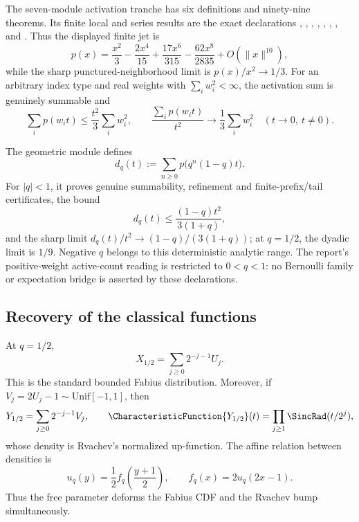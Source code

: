 \documentclass[11pt]{article}
\numberwithin{equation}{section}
\theoremstyle{definition}
\theoremstyle{remark}
\begin{document}
The seven-module activation tranche has six definitions and ninety-nine theorems.  Its
finite local and series results are the exact declarations
,
,
,
,
,
,
, and
.  Thus the displayed finite jet is
\[
 p(x)=\frac{x^2}{3}-\frac{2x^4}{15}+\frac{17x^6}{315}
      -\frac{62x^8}{2835}+O(\lVert x\rVert^{10}),
\]
while the sharp punctured-neighborhood limit is \(p(x)/x^2\to1/3\).  For an arbitrary
index type and real weights with \(\sum_iw_i^2<\infty\), the activation sum is genuinely
summable and
\[
 \sum_i p(w_i t)\le \frac{t^2}{3}\sum_iw_i^2,
 \qquad
 \frac{\sum_i p(w_i t)}{t^2}\longrightarrow
 \frac13\sum_iw_i^2\quad(t\to0,\ t\ne0).
\]

The geometric module defines
\[
 d_q(t):=\sum_{n\ge0}p\bigl(q^n(1-q)t\bigr).
\]
For \(\lvert q\rvert<1\), it proves genuine summability, refinement and finite-prefix/tail
certificates, the bound
\[
 d_q(t)\le\frac{(1-q)t^2}{3(1+q)},
\]
and the sharp limit \(d_q(t)/t^2\to(1-q)/(3(1+q))\); at \(q=1/2\), the dyadic limit is
\(1/9\).  Negative \(q\) belongs to this deterministic analytic range.  The report's
positive-weight active-count reading is restricted to \(0<q<1\): no Bernoulli family or
expectation bridge is asserted by these declarations.

\subsection{Recovery of the classical functions}

At $q=1/2$,
\[
 X_{1/2}=\sum_{j\ge0}2^{-j-1}U_j.
\]
This is the standard bounded Fabius distribution.  Moreover, if
$V_j=2U_j-1\sim\mathrm{Unif}[-1,1]$, then
\[
 Y_{1/2}=\sum_{j\ge0}2^{-j-1}V_j,
 \qquad
 \CharacteristicFunction{Y_{1/2}}(t)=\prod_{j\ge1}\SincRad(t/2^j),
\]
whose density is Rvachev's normalized up-function.  The affine relation between densities is
\begin{equation}
 u_q(y)=\frac12 f_q\!\left(\frac{y+1}{2}\right),
 \qquad
 f_q(x)=2u_q(2x-1).                         \label{p10:eq:affine-density}
\end{equation}
Thus the free parameter deforms the Fabius CDF and the Rvachev bump simultaneously.
\end{document}
